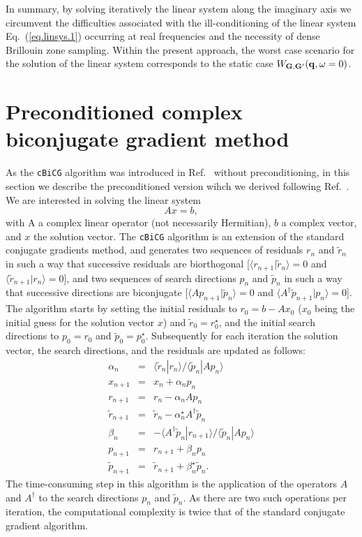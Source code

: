 \documentclass[twocolumn,prb,showpacs,superscriptaddress]{revtex4}
\def\w{\omega}
\def\>{\rangle}
\def\<{\langle}
\def\q{{\bf q}}
\def\G{{\bf G}}
\def\Gp{{\bf G^\prime}}
\def\rt{\tilde{r}}
\def\pt{\tilde{p}}
\begin{document}
In summary, by solving iteratively the linear system along the imaginary
axis we circumvent the difficulties associated with the ill-conditioning
of the linear system Eq.\ (\ref{eq.linsys.1}) occurring at real frequencies
and the necessity of dense Brillouin zone sampling.
Within the present approach, the worst case scenario for the solution 
of the linear system corresponds to the static case $W_{\G,\Gp}(\q,\w=0)$.

\section{Preconditioned complex biconjugate gradient method}

As the {\tt cBiCG} algorithm was introduced in Ref.\  
without preconditioning, in this section we describe the preconditioned version 
wihch we derived following Ref.~.
%
We are interested in solving the linear system
  \begin{equation}\label{eq.axeqb}
  Ax=b,
  \end{equation}
with A a complex linear operator (not necessarily Hermitian), $b$ a complex 
vector, and $x$ the solution vector.
The {\tt cBiCG} algorithm is an extension of the standard conjugate
gradients method, and generates two sequences of residuals $r_n$ and
$\rt_n$ in such a way that successive residuals 
are biorthogonal [$\<r_{n+1}|\rt_n\>=0$ and $\<\rt_{n+1}|r_n\>=0$], 
and two sequences of search directions 
$p_n$ and $\pt_n$ in such a way that successive directions
are biconjugate [$\< A p_{n+1}|\pt_n \> =0$ and 
$\< A^\dagger \pt_{n+1}|p_n \> =0$].\cite{jacobs}
The algorithm starts by setting the initial residuals to
$r_0 = b-Ax_0$ ($x_0$ being the initial guess for the solution vector $x$) 
and $\rt_0=r_0^\star$, and the initial search directions to $p_0=r_0$ 
and $\pt_0=p_0^\star$.
Subsequently for each iteration the solution
vector, the search directions, and the residuals are updated as follows:
  \begin{eqnarray}
  \alpha_n & = & \<\rt_n|r_n\>/\<\pt_n|Ap_n\> \label{eq.cg1}  \\ 
  x_{n+1} & = & x_n + \alpha_n p_n \label{eq.cg2} \\ 
  r_{n+1} & = & r_n - \alpha_n Ap_n \label{eq.cg3} \\ 
  \rt_{n+1} & = & \rt_n - \alpha_n^\star A^\dagger \pt_n \label{eq.cg4}\\ 
  \beta_n & = & - \<A^\dagger\pt_n|r_{n+1}\>/\<\pt_n|Ap_n\> \label{eq.cg5}\\ 
  p_{n+1} & = & r_{n+1} + \beta_n p_n \label{eq.cg6}\\ 
  \pt_{n+1} & = & \rt_{n+1} + \beta_n^\star \label{eq.cg7} \pt_n. 
  \end{eqnarray}
The time-consuming step in this algorithm is the application of the operators
$A$ and $A^\dagger$ to the search directions $p_n$ and $\pt_n$. 
As there are two such operations per iteration, the computational complexity 
is twice that of the standard conjugate gradient algorithm.
\end{document}
